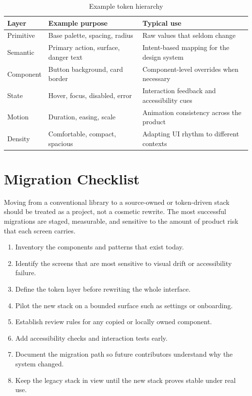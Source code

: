 \documentclass[11pt,twoside,a4paper]{article}
\begin{document}
\begin{table}[htbp]
  \centering
  \caption{Example token hierarchy}
  \begin{tabularx}{\textwidth}{@{}p{}p{}Y@{}}
    \toprule
    \textbf{Layer} & \textbf{Example purpose} & \textbf{Typical use} \\
    \midrule
    Primitive & Base palette, spacing, radius & Raw values that seldom change \\
    Semantic & Primary action, surface, danger text & Intent-based mapping for the design system \\
    Component & Button background, card border & Component-level overrides when necessary \\
    State & Hover, focus, disabled, error & Interaction feedback and accessibility cues \\
    Motion & Duration, easing, scale & Animation consistency across the product \\
    Density & Comfortable, compact, spacious & Adapting UI rhythm to different contexts \\
    \bottomrule
  \end{tabularx}
\end{table}

\section{Migration Checklist}
Moving from a conventional library to a source-owned or token-driven stack should be treated as a project, not a cosmetic rewrite. The most successful migrations are staged, measurable, and sensitive to the amount of product risk that each screen carries.

\begin{enumerate}[leftmargin=*, itemsep=0.45em]
  \item Inventory the components and patterns that exist today.
  \item Identify the screens that are most sensitive to visual drift or accessibility failure.
  \item Define the token layer before rewriting the whole interface.
  \item Pilot the new stack on a bounded surface such as settings or onboarding.
  \item Establish review rules for any copied or locally owned component.
  \item Add accessibility checks and interaction tests early.
  \item Document the migration path so future contributors understand why the system changed.
  \item Keep the legacy stack in view until the new stack proves stable under real use.
\end{enumerate}
\end{document}
